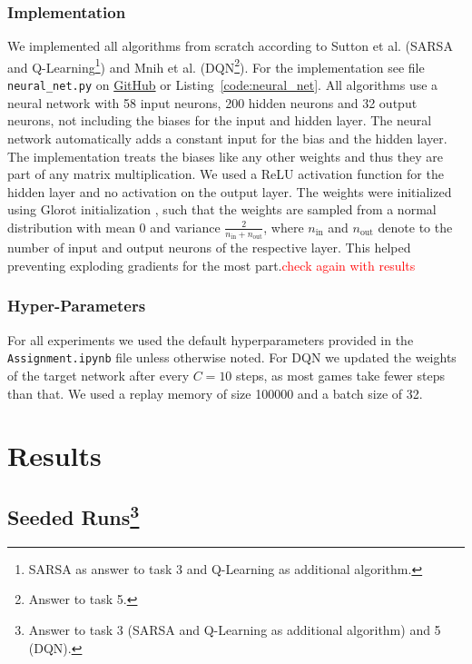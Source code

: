 \documentclass[conference]{IEEEtran}
\begin{document}
\subsubsection{Implementation}

We implemented all algorithms from scratch according to Sutton et al. \cite{sutton2018} (SARSA and Q-Learning\footnote{SARSA as answer to task 3 and Q-Learning as additional algorithm.}) and Mnih et al. \cite{dqn2015} (DQN\footnote{Answer to task 5.}). For the implementation see file \verb"neural_net.py" on \href{https://github.com/TwoDigitsOneNumber/IntroRL_ChessAssignment}{GitHub} or Listing~\ref{code:neural_net}. All algorithms use a neural network with 58 input neurons, 200 hidden neurons and 32 output neurons, not including the biases for the input and hidden layer. The neural network automatically adds a constant input for the bias and the hidden layer. 
The implementation treats the biases like any other weights and thus they are part of any matrix multiplication. We used a ReLU activation function for the hidden layer and no activation on the output layer.
The weights were initialized using Glorot initialization \cite{glorot2010}, such that the weights are sampled from a normal distribution with mean 0 and variance $\frac{2}{n_{\text{in}} + n_{\text{out}}}$, where $n_\text{in}$ and $n_\text{out}$ denote to the number of input and output neurons of the respective layer. This helped preventing exploding gradients for the most part.\textcolor{red}{check again with results}

\subsubsection{Hyper-Parameters}

For all experiments we used the default hyperparameters provided in the \verb"Assignment.ipynb" file unless otherwise noted.
For DQN we updated the weights of the target network after every $C=10$ steps, as most games take fewer steps than that. We used a replay memory of size 100000 and a batch size of 32.




\section{Results}\label{sec:results}

\subsection{Seeded Runs\footnote{Answer to task 3 (SARSA and Q-Learning as additional algorithm) and 5 (DQN).}}
\end{document}
